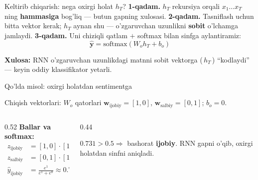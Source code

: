 \documentclass[aspectratio=169,11pt]{beamer}
\begin{document}
\begin{frame}{Keltirib chiqarish: nega oxirgi holat $h_T$?}
  \textbf{1-qadam.} $h_T$ rekursiya orqali $x_1\ldots x_T$ ning \textbf{hammasiga}
  bog'liq --- butun gapning xulosasi.
  \pause
  \textbf{2-qadam.} Tasniflash uchun bitta vektor kerak; $h_T$ aynan shu ---
  o'zgaruvchan uzunlikni \textbf{sobit} o'lchamga jamlaydi.
  \pause
  \textbf{3-qadam.} Uni chiziqli qatlam $+$ softmax bilan sinfga aylantiramiz:
  $$ \hat{\mathbf{y}} = \mathrm{softmax}(W_o h_T + b_o) $$
  \begin{tcolorbox}[okbox,top=2pt,bottom=2pt]
    \small \textbf{Xulosa:} RNN o'zgaruvchan uzunlikdagi matnni sobit vektorga
    (\,$h_T$\,) ``kodlaydi'' --- keyin oddiy klassifikator yetarli.
  \end{tcolorbox}
\end{frame}

\begin{frame}{Qo'lda misol: oxirgi holatdan sentimentga}
  \begin{tcolorbox}[defbox,title={$h_T=[1,0]$; ballar: ijobiy va salbiy}]
    \small
    Chiqish vektorlari: $W_o$ qatorlari $\mathbf{w}_{\text{ijobiy}}=[1,0]$,
    $\mathbf{w}_{\text{salbiy}}=[0,1]$; $b_o=0$.
  \end{tcolorbox}
  \vspace{0.2em}
  \begin{columns}[T]
    \begin{column}{0.52\textwidth}
      \textbf{Ballar va softmax:}
      \begin{align*}
        z_{\text{ijobiy}} &= [1,0]\cdot[1,0] = 1\\
        z_{\text{salbiy}} &= [0,1]\cdot[1,0] = 0\\
        \hat{y}_{\text{ijobiy}} &= \frac{e^{1}}{e^{1}+e^{0}} \approx \mathbf{0.731}
      \end{align*}
    \end{column}
    \begin{column}{0.44\textwidth}
      \begin{tcolorbox}[okbox,top=2pt,bottom=2pt]
        \footnotesize
        $0.731 > 0.5 \Rightarrow$ bashorat \textbf{ijobiy}. RNN gapni o'qib,
        oxirgi holatdan sinfni aniqladi.
      \end{tcolorbox}
    \end{column}
  \end{columns}
\end{frame}
\end{document}
